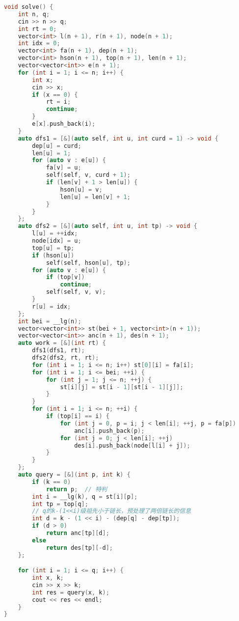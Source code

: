 \begin{lstlisting}[language=C++]
void solve() {
    int n, q;
    cin >> n >> q;
    int rt = 0;
    vector<int> l(n + 1), r(n + 1), node(n + 1);
    int idx = 0;
    vector<int> fa(n + 1), dep(n + 1);
    vector<int> hson(n + 1), top(n + 1), len(n + 1);
    vector<vector<int>> e(n + 1);
    for (int i = 1; i <= n; i++) {
        int x;
        cin >> x;
        if (x == 0) {
            rt = i;
            continue;
        }
        e[x].push_back(i);
    }
    auto dfs1 = [&](auto self, int u, int curd = 1) -> void {
        dep[u] = curd;
        len[u] = 1;
        for (auto v : e[u]) {
            fa[v] = u;
            self(self, v, curd + 1);
            if (len[v] + 1 > len[u]) {
                hson[u] = v;
                len[u] = len[v] + 1;
            }
        }
    };
    auto dfs2 = [&](auto self, int u, int tp) -> void {
        l[u] = ++idx;
        node[idx] = u;
        top[u] = tp;
        if (hson[u])
            self(self, hson[u], tp);
        for (auto v : e[u]) {
            if (top[v])
                continue;
            self(self, v, v);
        }
        r[u] = idx;
    };
    int bei = __lg(n);
    vector<vector<int>> st(bei + 1, vector<int>(n + 1));
    vector<vector<int>> anc(n + 1), des(n + 1);
    auto work = [&](int rt) {
        dfs1(dfs1, rt);
        dfs2(dfs2, rt, rt);
        for (int i = 1; i <= n; i++) st[0][i] = fa[i];
        for (int i = 1; i <= bei; ++i) {
            for (int j = 1; j <= n; ++j) {
                st[i][j] = st[i - 1][st[i - 1][j]];
            }
        }
        for (int i = 1; i <= n; ++i) {
            if (top[i] == i) {
                for (int j = 0, p = i; j < len[i]; ++j, p = fa[p])
                    anc[i].push_back(p);
                for (int j = 0; j < len[i]; ++j)
                    des[i].push_back(node[l[i] + j]);
            }
        }
    };
    auto query = [&](int p, int k) {
        if (k == 0)
            return p;  // 特判
        int i = __lg(k), q = st[i][p];
        int tp = top[q];
        // q的k-(1<<i)级祖先小于链长，预处理了两倍链长的信息
        int d = k - (1 << i) - (dep[q] - dep[tp]);
        if (d > 0)
            return anc[tp][d];
        else
            return des[tp][-d];
    };

    for (int i = 1; i <= q; i++) {
        int x, k;
        cin >> x >> k;
        int res = query(x, k);
        cout << res << endl;
    }
}

\end{lstlisting}
